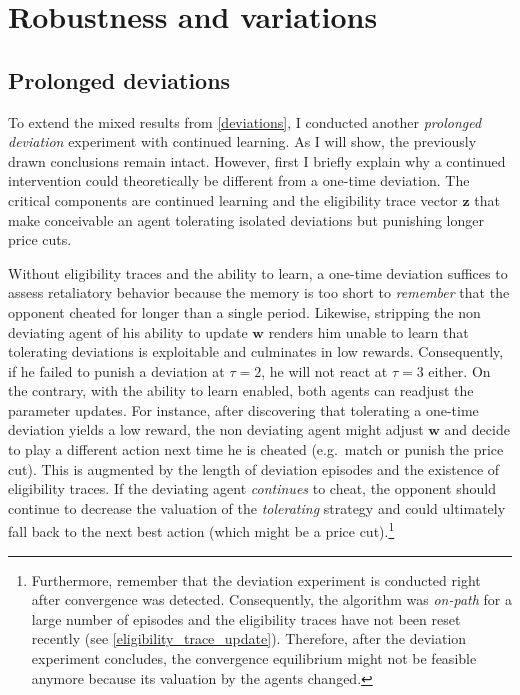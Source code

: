 \section{Robustness and variations}\label{robustness}


\subsection{Prolonged deviations}

To extend the mixed results from \autoref{deviations}, I conducted another \emph{prolonged deviation} experiment with continued learning. As I will show, the previously drawn conclusions remain intact. However, first I briefly explain why a continued intervention could theoretically be different from a one-time deviation. The critical components are continued learning and the eligibility trace vector $\boldsymbol{z}$ that make conceivable an agent tolerating isolated deviations but punishing longer price cuts.

Without eligibility traces and the ability to learn, a one-time deviation suffices to assess retaliatory behavior because the memory is too short to \emph{remember} that the opponent cheated for longer than a single period. Likewise, stripping the non deviating agent of his ability to update $\boldsymbol{w}$ renders him unable to learn that tolerating deviations is exploitable and culminates in low rewards. Consequently, if he failed to punish a deviation at $\tau = 2$, he will not react at $\tau = 3$ either. On the contrary, with the ability to learn enabled, both agents can readjust the parameter updates. For instance, after discovering that tolerating a one-time deviation yields a low reward, the non deviating agent might adjust $\boldsymbol{w}$ and decide to play a different action next time he is cheated (e.g.\ match or punish the price cut). This is augmented by the length of deviation episodes and the existence of eligibility traces. If the deviating agent \emph{continues} to cheat, the opponent should continue to decrease the valuation of the \emph{tolerating} strategy and could ultimately fall back to the next best action (which might be a price cut).\footnote{Furthermore, remember that the deviation experiment is conducted right after convergence was detected. Consequently, the algorithm was \emph{on-path} for a large number of episodes and the eligibility traces have not been reset recently (see \autoref{eligibility_trace_update}). Therefore, after the deviation experiment concludes, the convergence equilibrium might not be feasible anymore because its valuation by the agents changed.}

